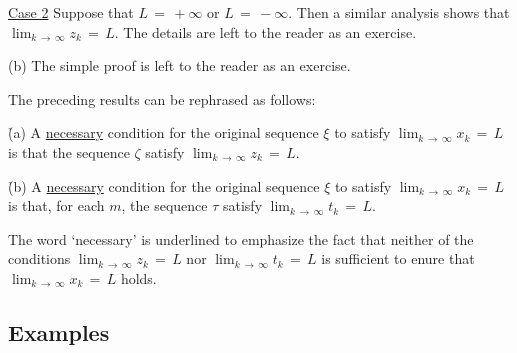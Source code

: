 {        \underline{Case 2} Suppose that $L \,=\, +{\infty}$ or $L \,=\, -{\infty}$. Then a similar analysis shows that $\lim_{k \,{\rightarrow}\, {\infty}} z_{k} \,=\, L$.
    The details are left to the reader as an exercise.

\V

        (b) The simple proof is left to the reader as an exercise.

\V
\V

        The preceding results can be rephrased as follows:

        \h (a) A \underline{necessary} condition for the original sequence ${\xi}$ to satisfy $\lim_{k \,{\rightarrow}\, {\infty}} x_{k} \,=\, L$
    is that the sequence ${\zeta}$ satisfy $\lim_{k \,{\rightarrow}\, {\infty}} z_{k} \,=\, L$.

        \h (b) A \underline{necessary} condition for the original sequence ${\xi}$ to satisfy $\lim_{k \,{\rightarrow}\, {\infty}} x_{k} \,=\, L$
    is that, for each $m$, the sequence ${\tau}$ satisfy $\lim_{k \,{\rightarrow}\, {\infty}} t_{k} \,=\, L$.

        The word `necessary' is underlined to emphasize the fact that neither of the conditions $\lim_{k \,{\rightarrow}\, {\infty}} z_{k} \,=\, L$ nor $\lim_{k \,{\rightarrow}\, {\infty}} t_{k} \,=\, L$ is sufficient to enure that $\lim_{k \,{\rightarrow}\, {\infty}} x_{k} \,=\, L$ holds.

\V
\V


            \subsection{\small{\bf Examples}}
            \label{ExampC100.30}

\V

}
